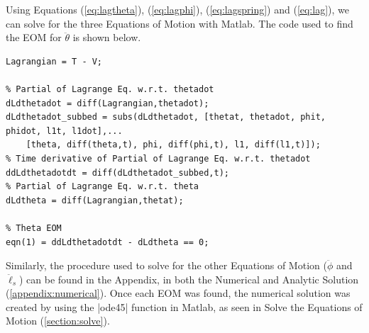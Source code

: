 \documentclass[12pt]{report}
\begin{document}
\begin{flushleft}
Using Equations (\ref{eq:lagtheta}), (\ref{eq:lagphi}), (\ref{eq:lagspring}) and (\ref{eq:lag}), we can
solve for the three Equations of Motion with Matlab. The code used to find the EOM
for $\ddot{\theta}$ is shown below.

\begin{lstlisting}[frame=lines,style=Matlab-editor,basicstyle = \mlttfamily]
Lagrangian = T - V;

% Partial of Lagrange Eq. w.r.t. thetadot
dLdthetadot = diff(Lagrangian,thetadot);
dLdthetadot_subbed = subs(dLdthetadot, [thetat, thetadot, phit, phidot, l1t, l1dot],...
    [theta, diff(theta,t), phi, diff(phi,t), l1, diff(l1,t)]);
% Time derivative of Partial of Lagrange Eq. w.r.t. thetadot
ddLdthetadotdt = diff(dLdthetadot_subbed,t);
% Partial of Lagrange Eq. w.r.t. theta
dLdtheta = diff(Lagrangian,thetat);

% Theta EOM
eqn(1) = ddLdthetadotdt - dLdtheta == 0;
\end{lstlisting}
Similarly, the procedure used to solve for the other Equations of Motion ($\ddot{\phi}$ and $\ddot{\ell}_s$) can be found in the Appendix, in both the Numerical and Analytic Solution (\ref{appendix:numerical}). Once each EOM was found, the numerical solution was created by using the |ode45| function in Matlab, as seen in Solve the Equations of Motion (\ref{section:solve}).

\end{flushleft}
\end{document}
